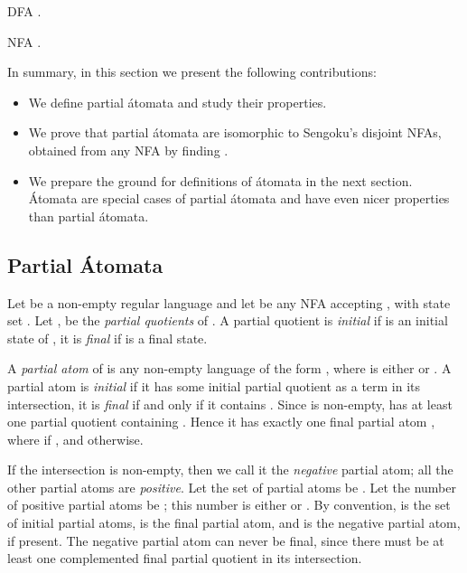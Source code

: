 \documentclass[preprint,12pt]{elsarticle}
\newcommand{\bi}{\begin{itemize}}
\newcommand{\ei}{\end{itemize}}
\begin{document}
\begin{table}[hbt]
\begin{minipage}[b]{0.4\linewidth}
\caption{DFA .}
\label{tab:Nrd}
{\footnotesize
\begin{center}

\end{center}}
\end{minipage}
\hspace{.5cm}
\begin{minipage}[b]{0.4\linewidth}
\caption{NFA .}
\label{tab:Nrdr}
{\footnotesize
\begin{center}

\end{center}}
\end{minipage}
\end{table}
In summary, in this section we present the following contributions:
\bi
\item
We define partial \'atomata and study their properties.
\item
We prove that partial \'atomata are isomorphic to Sengoku's disjoint NFAs, obtained from any NFA  by finding .
\item
We prepare the ground for definitions of \'atomata in the next section.
\'Atomata are special cases of partial \'atomata and have even nicer properties than partial \'atomata.
\ei

\subsection{Partial \'Atomata}
Let  be a non-empty regular language and 
let  be any NFA accepting , with
state set .
Let   ,  be 
the  \emph{partial quotients} of .
A partial quotient  is \emph{initial} if  is an initial state of ,
it is \emph{final} if  is a final state.


A \emph{partial atom} of  is any non-empty language 
of the form 
, 
where  is either  or .
A partial atom is \emph{initial} if it has some initial partial quotient 
 as a term in its intersection, 
it is \emph{final} if and only if it contains .
Since  is non-empty,  has at least one partial quotient containing . 
Hence it has exactly one final partial atom
, where 
 if , and  otherwise.

If the intersection 
 is non-empty, then we call it 
the \emph{negative} partial atom; all the other partial atoms are \emph{positive}. 
Let the set of partial atoms be . 
Let the number of positive partial atoms be ; this number is either  or .
By convention,  is the set of initial partial atoms,
 is the final partial atom, and  is the negative partial atom, if  present.
The negative partial atom can never be final, 
since there must be at least one complemented final partial quotient in its intersection.
\end{document}
